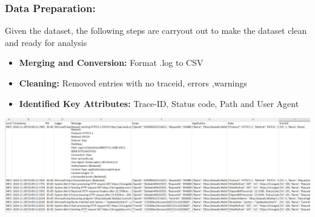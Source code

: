 \documentclass[10pt, a4paper]{beamer}
\begin{document}
	
	\begin{frame}
		\frametitle{Data Preparation:} 
		Given the dataset, the following steps are carryout out to make the dataset clean and ready for analysis
		\begin{block}{}
			\begin{itemize}
				\item \textbf{Merging and Conversion:} Format .log to CSV
				\item \textbf{Cleaning:} Removed entries with no traceid, errors ,warnings
				\item \textbf{Identified Key Attributes:} Trace-ID, Status code, Path and User Agent
			\end{itemize}
		\end{block}
		
		
		\centering
		\includegraphics[width=1\textwidth]{images/csvFIle.png} %
		
		\vskip 0.1cm %
		\centering
		
	\end{frame}
	
	
	
\end{document}
